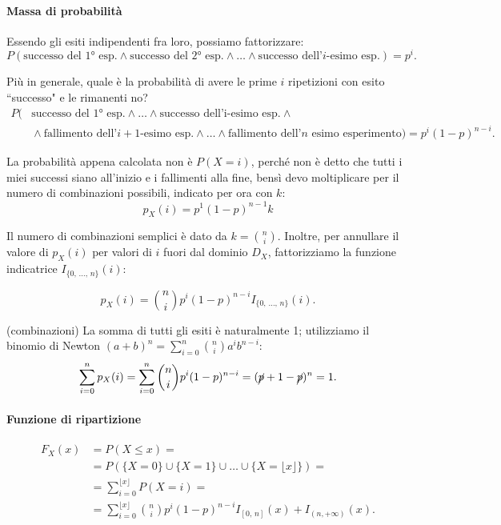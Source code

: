 \paragraph{Massa di probabilità} Essendo gli esiti indipendenti fra loro, possiamo fattorizzare: \[
P(\text{successo del 1° esp.} \land \text{successo del 2° esp.} \land \dots \land \text{successo dell'$i$-esimo esp.}) = p^i.
\]

\noindent Più in generale, quale è la probabilità di avere le prime $i$ ripetizioni con esito ``successo" e le rimanenti no? \begin{align*}
P(&\text{successo del 1° esp.} \land \dots \land \text{successo dell'i-esimo esp.} \land \phantom{a} \\[-0.3em]
& \! \land \text{fallimento dell'$i+1$-esimo esp.} \land \dots 
\land \text{fallimento dell'$n$ esimo esperimento}) = p^i (1-p)^{n-i}.
\end{align*}

\noindent La probabilità appena calcolata non è $P(X=i)$, perché non è detto che tutti i miei successi siano all'inizio e i fallimenti alla fine, bensì devo moltiplicare per il numero di combinazioni possibili, indicato per ora con $k$: \[
p_X(i) = p^1 (1-p)^{n-1} k
\]

\noindent Il numero di combinazioni semplici è dato da $k = \binom n i$. Inoltre, per annullare il valore di $p_X(i)$ per valori di $i$ fuori dal dominio $D_X$, fattorizziamo la funzione indicatrice $I_{\{ 0, \, \dots, \, n \}}(i)$:

\[
\boxed{p_X(i) = \binom{n}{i} p^i (1-p)^{n-i} I_{\{ 0, \, \dots, \, n \}}(i)}.
\]

\noindent (combinazioni) La somma di tutti gli esiti è naturalmente 1; utilizziamo il binomio di Newton $(a+b)^n = \sum_{i=0}^n \binom n i a^i b^{n-i}$: \[
\sum_{i=0}^n p_X(i) = \sum_{i=0}^n \binom n i p^i (1-p)^{n-i} = (\cancel p+1- \cancel p)^n = 1.
\]

\paragraph{Funzione di ripartizione}
\begin{align*}
F_X(x) &= P(X \leq x) = \\ 
&= P\left( \{ X = 0 \} \cup \{ X = 1 \} \cup \dots \cup \{ X = \lfloor x \rfloor \} \right) = \\
&= \sum_{i=0}^{\lfloor x \rfloor} P(X=i) = \\
&= \sum_{i=0}^{\lfloor x \rfloor} \binom n i p^i (1-p)^{n-i} I_{[0, \, n]}(x) + I_{(n, +\infty)}(x).
\end{align*}

